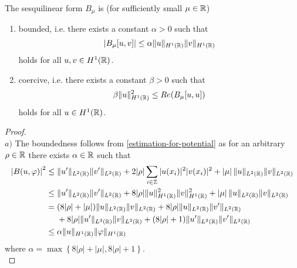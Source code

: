 \begin{theorem} \label{2.1:thm-LaxMilgram}
	The sesquilinear form $B_{\mu}$ is (for sufficiently small $\mu \in \mathbb{R}$)
	\begin{enumerate}[label=\alph*\upshape)]
		\item bounded, i.e. there exists a constant $\alpha > 0$ such that
			\[ \left| B_{\mu}[u,v] \right| \leq \alpha \|u\|_{H^{1}(\mathbb{R})} \|v\|_{H^{1}(\mathbb{R})} \]
			holds for all $u, v \in H^{1}(\mathbb{R})$.
		\item coercive, i.e. there exists a constant $\beta > 0$ such that
			\[ \beta \|u\|_{H^{1}(\mathbb{R})}^{2} \leq Re(B_{\mu}[u, u]) \]
			holds for all $u \in H^{1}(\mathbb{R})$.
	\end{enumerate} 
	
	\begin{proof} ~\\
		$a)$ The boundedness follows from \eqref{estimation-for-potential} as for an arbitrary $\rho \in \mathbb{R}$ there exists $\alpha \in \mathbb{R}$ such that
		\begin{align*}
			\left| B(u, \varphi) \right|^{2} & \leq \| u' \|_{L^{2}(\mathbb{R})} \| v' \|_{L^{2}(\mathbb{R})} + 2 |\rho |\sum_{i \in \mathbb{Z}} |u(x_{i})|^{2} |v(x_{i})|^{2} + \left| \mu \right| \| u \|_{L^{2}(\mathbb{R})} \| v \|_{L^{2}(\mathbb{R})} \\
				& \leq \| u' \|_{L^{2}(\mathbb{R})} \| v' \|_{L^{2}(\mathbb{R})} + 8 |\rho| \| u \|^{2}_{H^{1}(\mathbb{R})} \| v \|^{2}_{H^{1}(\mathbb{R})}  + \left| \mu \right| \| u \|_{L^{2}(\mathbb{R})} \| v \|_{L^{2}(\mathbb{R})} \\
				& = (8|\rho| + \left| \mu \right|) \| u \|_{L^{2}(\mathbb{R})} \| v \|_{L^{2}(\mathbb{R})} + 8 |\rho| \| u \|_{L^{2}(\mathbb{R})} \| v' \|_{L^{2}(\mathbb{R})} \\
				& ~\quad + 8 |\rho| \| u' \|_{L^{2}(\mathbb{R})} \| v \|_{L^{2}(\mathbb{R})} + (8 |\rho| + 1) \| u' \|_{L^{2}(\mathbb{R})} \| v'\|_{L^{2}(\mathbb{R})} \\
				& \leq \alpha \| u \|_{H^{1}(\mathbb{R})} \| \varphi \|_{H^{1}(\mathbb{R})}
		\end{align*}
		where $\alpha = \max \left\{ 8|\rho| + \left| \mu \right| , 8 |\rho| + 1 \right\}$. \\
		

\end{proof}
\end{theorem}
